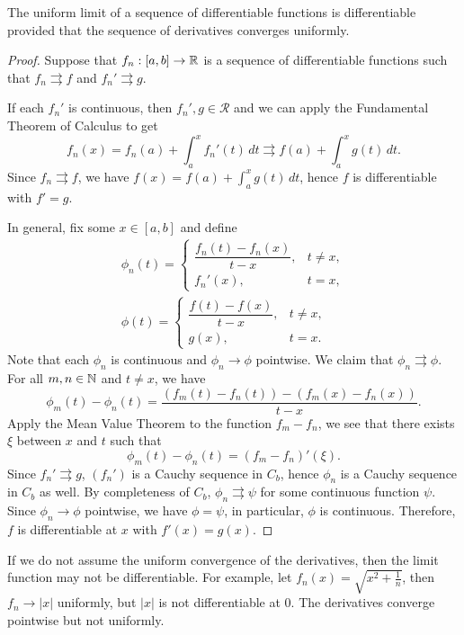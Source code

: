 \begin{prop}
    The uniform limit of a sequence of differentiable functions is differentiable provided that the sequence of derivatives converges uniformly.
    \begin{proof}
        Suppose that $f_n: [a, b] \to {\mathbb R}$ is a sequence of differentiable functions such that $f_n \rightrightarrows f$ and $f_n' \rightrightarrows g$. 

        If each $f_n'$ is continuous, then $f_n', g \in \mathcal R$ and we can apply the Fundamental Theorem of Calculus to get
        \[
        f_n(x) = f_n(a) + \int_a^x f_n'(t) \, dt \rightrightarrows f(a) + \int_a^x g(t) \, dt.
        \]
        Since $f_n \rightrightarrows f$, we have $f(x) = f(a) + \int_a^x g(t) \, dt$, hence $f$ is differentiable with $f' = g$.

        In general, fix some $x \in [a, b]$ and define
        \begin{gather*}
            \phi_n(t) = \begin{cases}
                \dfrac{f_n(t) - f_n(x)}{t - x}, & t \neq x, \\
                f_n'(x), & t = x,
            \end{cases} \\
            \phi(t) = \begin{cases}
                \dfrac{f(t) - f(x)}{t - x}, & t \neq x, \\
                g(x), & t = x.
            \end{cases}
        \end{gather*}
        Note that each $\phi_n$ is continuous and $\phi_n \to \phi$ pointwise. We claim that $\phi_n \rightrightarrows \phi$. For all $m, n \in {\mathbb N}$ and $t \neq x$, we have
        \[
        \phi_m(t) - \phi_n(t) = \frac{(f_m(t) - f_n(t)) - (f_m(x) - f_n(x))}{t - x}.
        \]
        Apply the Mean Value Theorem to the function $f_m - f_n$, we see that there exists $\xi$ between $x$ and $t$ such that
        \[
        \phi_m(t) - \phi_n(t) = (f_m - f_n)'(\xi).
        \]
        Since $f_n' \rightrightarrows g$, $(f_n')$ is a Cauchy sequence in $C_b$, hence $\phi_n$ is a Cauchy sequence in $C_b$ as well. By completeness of $C_b$, $\phi_n \rightrightarrows \psi$ for some continuous function $\psi$. Since $\phi_n \to \phi$ pointwise, we have $\phi = \psi$, in particular, $\phi$ is continuous. Therefore, $f$ is differentiable at $x$ with $f'(x) = g(x)$. 
    \end{proof}
\end{prop}

\begin{rmk}
    If we do not assume the uniform convergence of the derivatives, then the limit function may not be differentiable. For example, let $f_n(x) = \sqrt{x^2 + \frac1n}$, then $f_n \to |x|$ uniformly, but $|x|$ is not differentiable at $0$. The derivatives converge pointwise but not uniformly.
\end{rmk}
